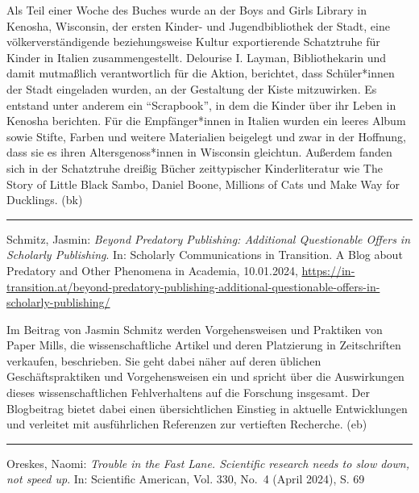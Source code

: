 \documentclass[a4paper,
fontsize=11pt,
oneside,
numbers=noperiodatend,
parskip=half-,
bibliography=totoc,
final
]{scrartcl}
\begin{document}
Als Teil einer Woche des Buches wurde an der Boys and Girls Library in
Kenosha, Wisconsin, der ersten Kinder- und Jugendbibliothek der Stadt,
eine völkerverständigende beziehungsweise Kultur exportierende
Schatztruhe für Kinder in Italien zusammengestellt. Delourise I. Layman,
Bibliothekarin und damit mutmaßlich verantwortlich für die Aktion,
berichtet, dass Schüler*innen der Stadt eingeladen wurden, an der
Gestaltung der Kiste mitzuwirken. Es entstand unter anderem ein
\enquote{Scrapbook}, in dem die Kinder über ihr Leben in Kenosha
berichten. Für die Empfänger*innen in Italien wurden ein leeres Album
sowie Stifte, Farben und weitere Materialien beigelegt und zwar in der
Hoffnung, dass sie es ihren Altersgenoss*innen in Wisconsin gleichtun.
Außerdem fanden sich in der Schatztruhe dreißig Bücher zeittypischer
Kinderliteratur wie The Story of Little Black Sambo, Daniel Boone,
Millions of Cats und Make Way for Ducklings. (bk)

\begin{center}\rule{0.5\linewidth}{0.5pt}\end{center}

Schmitz, Jasmin: \emph{Beyond Predatory Publishing: Additional
Questionable Offers in Scholarly Publishing}. In: Scholarly
Communications in Transition. A Blog about Predatory and Other Phenomena
in Academia, 10.01.2024,
\url{https://in-transition.at/beyond-predatory-publishing-additional-questionable-offers-in-scholarly-publishing/}

Im Beitrag von Jasmin Schmitz werden Vorgehensweisen und Praktiken von
Paper Mills, die wissenschaftliche Artikel und deren Platzierung in
Zeitschriften verkaufen, beschrieben. Sie geht dabei näher auf deren
üblichen Geschäftspraktiken und Vorgehensweisen ein und spricht über die
Auswirkungen dieses wissenschaftlichen Fehlverhaltens auf die Forschung
insgesamt. Der Blogbeitrag bietet dabei einen übersichtlichen Einstieg
in aktuelle Entwicklungen und verleitet mit ausführlichen Referenzen zur
vertieften Recherche. (eb)

\begin{center}\rule{0.5\linewidth}{0.5pt}\end{center}

Oreskes, Naomi: \emph{Trouble in the Fast Lane. Scientific research
needs to slow down, not speed up}. In: Scientific American, Vol. 330,
No.~4 (April 2024), S. 69
\end{document}
